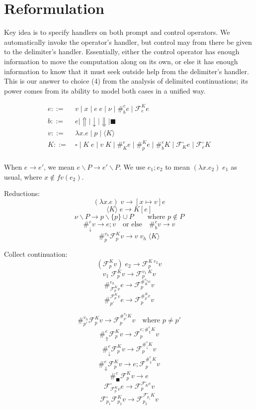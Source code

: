 \documentclass[11pt]{article}
\newcommand\x{\lambda x}
\newcommand\lseq{\mathbin\textrm{\guillemotleft}}
\newcommand\F{\mathcal{F}}
\newcommand{\angles}[1]{\langle#1\rangle}
\begin{document}
\section{Reformulation}

Key idea is to specify handlers on both prompt and control operators.
We automatically invoke the operator's handler, but control may from there be given to the delimiter's handler.
Essentially, either the control operator has enough information to move the computation along on its own, or else it has enough information to know that it must seek outside help from the delimiter's handler.
This is our answer to choice (4) from the analysis of delimited continuations; its power comes from its ability to model both cases in a unified way.


\begin{align*}
e ::=&\ v \mid x \mid e\;e \mid \nu \mid \#^e_be \mid \mathcal{F}^K_ee \\
b ::=&\ e \mid \Uparrow \mid {\downarrow} \mid {\Downarrow} \mid {\blacksquare} \\
v ::=&\ \x.e \mid p \mid \angles K \\
K ::=&\ \square \mid K\;e \mid v\;K \mid \#_K^ee \mid \#_p^Ke \mid \#_b^eK \mid \F^\square_Ke \mid \F_e^\square K\\
\end{align*}

When $e \to e'$, we mean $e\backslash P \to e' \backslash P$.
We use $e_1; e_2$ to mean $(\x.e_2)\;e_1$ as usual, where $x \notin fv(e_2)$.

Reductions:
$$(\x.e)\;v \to [x \mapsto v]e$$
$$\angles K\;e \to K[e]$$
$$\nu \backslash P \to p \backslash \{p\} \cup P \qquad\textrm{where $p \notin P$}$$
$$\#^e_\downarrow v \to e; v
	\quad\textrm{or else}\quad
  \#^e_bv \to v$$
$$\#_p^{v_h}\F_p^Kv \to v\;v_h\;\angles K$$

Collect continuation:
$$(\F^K_pv)\;e_2 \to \F^{K\;e_2}_pv$$
$$v_1\;\F^K_pv \to \F^{v_1\;K}_pv$$
$$\#_{\F_p^Kv}^{e_h}e \to \F_p^{\#_K^{e_h}e}v$$
$$\#^{\F_p^Kv}_{p'}e \to \F_p^{\#^K_{p'}e}v$$

$$\#_{p'}^{v_h}\F^K_pv \to \F^{\#_{p'}^{v_h}K}_pv
  	\quad\textrm{where }p \neq p'$$
$$\#^e_\Uparrow\F^K_pv \to \F^{e;\#^e_\Uparrow K}_pv$$
$$\#^e_\downarrow \F^K_pv \to \F^{\#^e_\downarrow K}_pv$$
$$\#^e_\Downarrow \F^K_pv \to e;\F^{\#^e_\Downarrow K}_pv$$
$$\#^e_\blacksquare\F^K_pv \to e$$
$$\F^\square_{\F^K_pv}e \to \F^{\F^\square_Ke}_pv$$
$$\F^\square_{p_1}\F^K_{p_2}v \to \F^{\F^\square_{p_1}K}_{p_2}v$$
\end{document}
